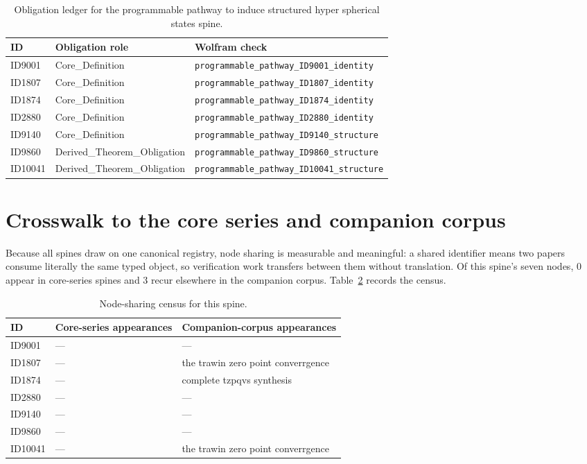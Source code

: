 \documentclass[11pt]{article}
\theoremstyle{remark}
\begin{document}
\begin{table}[ht]
\centering
\small
\caption{Obligation ledger for the programmable pathway to induce structured hyper spherical states spine.}
\label{tab:obligations}
\begin{tabular}{llp{6.2cm}}
\toprule
ID & Obligation role & Wolfram check \\
\midrule
ID9001 & Core\_Definition & \texttt{programmable\_pathway\_ID9001\_identity} \\
ID1807 & Core\_Definition & \texttt{programmable\_pathway\_ID1807\_identity} \\
ID1874 & Core\_Definition & \texttt{programmable\_pathway\_ID1874\_identity} \\
ID2880 & Core\_Definition & \texttt{programmable\_pathway\_ID2880\_identity} \\
ID9140 & Core\_Definition & \texttt{programmable\_pathway\_ID9140\_structure} \\
ID9860 & Derived\_Theorem\_Obligation & \texttt{programmable\_pathway\_ID9860\_structure} \\
ID10041 & Derived\_Theorem\_Obligation & \texttt{programmable\_pathway\_ID10041\_structure} \\
\bottomrule
\end{tabular}
\end{table}

\section{Crosswalk to the core series and companion corpus}
\label{sec:crosswalk}

Because all spines draw on one canonical registry, node sharing is measurable and meaningful: a shared identifier means two papers consume literally the same typed object, so verification work transfers between them without translation. Of this spine's seven nodes, 0 appear in core-series spines and 3 recur elsewhere in the companion corpus. Table~\ref{tab:crosswalk} records the census.

\begin{table}[ht]
\centering
\small
\caption{Node-sharing census for this spine.}
\label{tab:crosswalk}
\begin{tabular}{lp{4.4cm}p{6.6cm}}
\toprule
ID & Core-series appearances & Companion-corpus appearances \\
\midrule
ID9001 & --- & --- \\
ID1807 & --- & the trawin zero point converrgence \\
ID1874 & --- & complete tzpqvs synthesis \\
ID2880 & --- & --- \\
ID9140 & --- & --- \\
ID9860 & --- & --- \\
ID10041 & --- & the trawin zero point converrgence \\
\bottomrule
\end{tabular}
\end{table}
\end{document}

